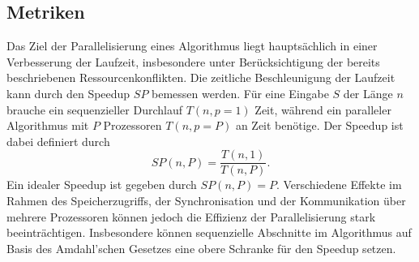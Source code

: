 \subsection{Metriken}
Das Ziel der Parallelisierung eines Algorithmus liegt hauptsächlich in einer Verbesserung der Laufzeit, insbesondere unter Berücksichtigung der bereits beschriebenen Ressourcenkonflikten. 
Die zeitliche Beschleunigung der Laufzeit kann durch den Speedup $SP$ bemessen werden. Für eine Eingabe $S$ der Länge $n$ brauche ein sequenzieller Durchlauf $T(n, p=1)$ Zeit, während ein 
paralleler Algorithmus mit $P$ Prozessoren $T(n,p=P)$ an Zeit benötige. Der Speedup ist dabei definiert durch
\begin{equation}
    SP(n,P) = \frac{T(n,1)}{T(n,P)}.
\end{equation}
Ein idealer Speedup ist gegeben durch $SP(n,P)=P$. Verschiedene Effekte im Rahmen des Speicherzugriffs, der Synchronisation und der Kommunikation über mehrere Prozessoren können jedoch
die Effizienz der Parallelisierung stark beeinträchtigen. Insbesondere können sequenzielle Abschnitte im Algorithmus auf Basis des Amdahl'schen Gesetzes \cite{mccool} eine obere Schranke 
für den Speedup setzen. 